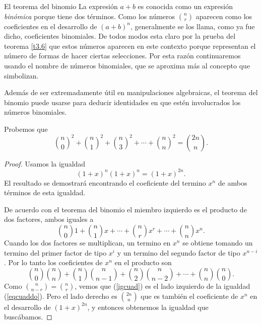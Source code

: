 \begin{section}{El teorema del binomio}
La expresión $a+b$ es conocida como un expresión {\it binómica}
porque tiene dos términos. Como los números   $\binom{n}{r}$ aparecen como los coeficientes en el
desarrollo de $(a+b)^n$, generalmente se los llama, como ya fue dicho, 
coeficientes binomiales.  
De todos modos esta claro por la prueba del teorema \ref{t3.6} que
estos números aparecen en este contexto porque representan el
número de formas de hacer ciertas selecciones. Por esta razón
continuaremos usando el nombre de números binomiales,
 que se aproxima más al concepto que
simbolizan.

Además de ser extremadamente útil en manipulaciones algebraicas,
el teorema del binomio puede usarse para deducir identidades en
que estén involucrados los números binomiales.

\begin{ejemplo}Probemos que
\begin{equation}\label{eqcuaddo}
\binom{n}{0}^2+\binom{n}{1}^2+\binom{n}{3}^2+\cdots+\binom{n}{n}^2=
\binom{2n}{n}.
\end{equation}
\end{ejemplo}
\begin{proof}
Usamos la igualdad
\begin{equation*}\label{eqxn}
(1+x)^n(1+x)^n=(1+x)^{2n}.
\end{equation*}
El resultado se demostrará encontrando el coeficiente del termino $x^n$ de ambos términos de esta igualdad.

De acuerdo con el teorema del binomio el miembro izquierdo es el
producto de dos factores, ambos iguales a
$$
\binom{n}{0}1+\binom{n}{1}x+\cdots+\binom{n}{r}x^r+\cdots+\binom{n}{n}x^n.
$$
 Cuando los dos factores se multiplican, un termino en $x^n$ se
obtiene tomando un termino del primer factor de tipo $x^i$ y un termino del
segundo factor de tipo $x^{n-i}$. Por lo tanto los coeficientes de $x^n$ en el
producto son
\begin{equation}\label{igcuad}
\binom{n}{0}\binom{n}{n}+\binom{n}{1}\binom{n}{n-1}+\binom{n}{2}\binom{n}{n-2}+\cdots
+\binom{n}{n}\binom{n}{0}.
\end{equation}
Como $\binom{n}{n-r}=\binom{n}{r}$, vemos que (\ref{igcuad}) es el lado
izquierdo de la igualdad (\ref{eqcuaddo}). Pero el lado derecho es
$\binom{2n}{n}$ que es también el coeficiente de $x^n$ en el
desarrollo de $(1+x)^{2n}$, y entonces obtenemos la igualdad que
buscábamos.
\end{proof}


\end{section}
